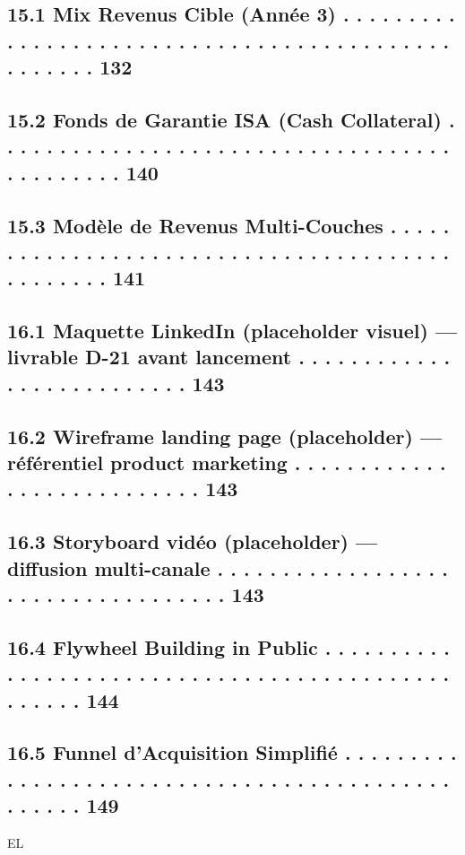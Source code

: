 \documentclass[12pt,landscape,a4paper]{article}
\begin{document}
\subsection{15.1 Mix Revenus Cible (Année 3) . . . . . . . . . . . . . . . . . . . . . . . . . . . . . . . . . . . . . . . . . . . . . . . . . . 132}
\subsection{15.2 Fonds de Garantie ISA (Cash Collateral) . . . . . . . . . . . . . . . . . . . . . . . . . . . . . . . . . . . . . . . . . . . . 140}
\subsection{15.3 Modèle de Revenus Multi-Couches . . . . . . . . . . . . . . . . . . . . . . . . . . . . . . . . . . . . . . . . . . . . . . . 141}
\vspace{0.5em}
\subsection{16.1 Maquette LinkedIn (placeholder visuel) — livrable D-21 avant lancement . . . . . . . . . . . . . . . . . . . . . . . . . . 143}
\subsection{16.2 Wireframe landing page (placeholder) — référentiel product marketing . . . . . . . . . . . . . . . . . . . . . . . . . . . 143}
\subsection{16.3 Storyboard vidéo (placeholder) — diffusion multi-canale . . . . . . . . . . . . . . . . . . . . . . . . . . . . . . . . . . . 143}
\subsection{16.4 Flywheel Building in Public . . . . . . . . . . . . . . . . . . . . . . . . . . . . . . . . . . . . . . . . . . . . . . . . . . 144}
\subsection{16.5 Funnel d’Acquisition Simplifié . . . . . . . . . . . . . . . . . . . . . . . . . . . . . . . . . . . . . . . . . . . . . . . . . 149}
\vspace{0.5em}
\vspace{0.5em}
\vspace{0.5em}
\vspace{0.5em}
EL\\
\end{document}
